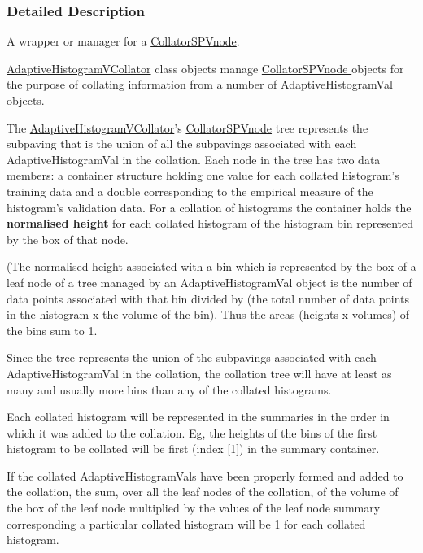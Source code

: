 \subsubsection{\-Detailed \-Description}
\-A wrapper or manager for a \hyperlink{classsubpavings_1_1CollatorSPVnode}{\-Collator\-S\-P\-Vnode}. 

\hyperlink{classsubpavings_1_1AdaptiveHistogramVCollator}{\-Adaptive\-Histogram\-V\-Collator} class objects manage \hyperlink{classsubpavings_1_1CollatorSPVnode}{\-Collator\-S\-P\-Vnode } objects for the purpose of collating information from a number of \-Adaptive\-Histogram\-Val objects.

\-The \hyperlink{classsubpavings_1_1AdaptiveHistogramVCollator}{\-Adaptive\-Histogram\-V\-Collator}'s \hyperlink{classsubpavings_1_1CollatorSPVnode}{\-Collator\-S\-P\-Vnode} tree represents the subpaving that is the union of all the subpavings associated with each \-Adaptive\-Histogram\-Val in the collation. \-Each node in the tree has two data members\-: a container structure holding one value for each collated histogram's training data and a double corresponding to the empirical measure of the histogram's validation data. \-For a collation of histograms the container holds the {\bfseries normalised height} for each collated histogram of the histogram bin represented by the box of that node.

(\-The normalised height associated with a bin which is represented by the box of a leaf node of a tree managed by an \-Adaptive\-Histogram\-Val object is the number of data points associated with that bin divided by (the total number of data points in the histogram x the volume of the bin). \-Thus the areas (heights x volumes) of the bins sum to 1.

\-Since the tree represents the union of the subpavings associated with each \-Adaptive\-Histogram\-Val in the collation, the collation tree will have at least as many and usually more bins than any of the collated histograms.

\-Each collated histogram will be represented in the summaries in the order in which it was added to the collation. \-Eg, the heights of the bins of the first histogram to be collated will be first (index \mbox{[}1\mbox{]}) in the summary container.

\-If the collated \-Adaptive\-Histogram\-Vals have been properly formed and added to the collation, the sum, over all the leaf nodes of the collation, of the volume of the box of the leaf node multiplied by the values of the leaf node summary corresponding a particular collated histogram will be 1 for each collated histogram. 

